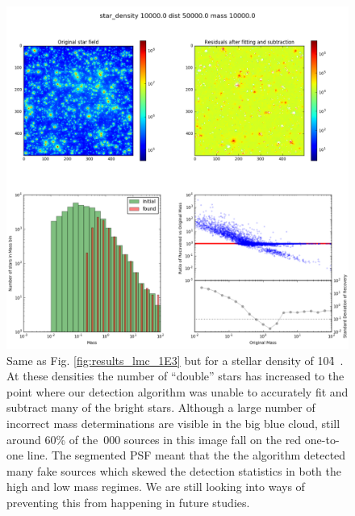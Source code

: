 \begin{appendix}
\begin{figure}

    \centering
    \includegraphics[width=\textwidth]{images/results6_dist=50000_rho=10000}

    \caption{Same as Fig. \ref{fig:results_lmc_1E3} but for a stellar density of 10\h4~\spa. At these densities the number of ``double'' stars has increased to the point where our detection algorithm was unable to accurately fit and subtract many of the bright stars. Although a large number of incorrect mass determinations are visible in the big blue cloud, still around 60\% of the \,000 sources in this image fall on the red one-to-one line. The segmented PSF meant that the the algorithm detected many fake sources which skewed the detection statistics in both the high and low mass regimes. We are still looking into ways of preventing this from happening in future studies.}
    
    \label{fig:results_lmc_1E4}
    
\end{figure}

\end{appendix}

